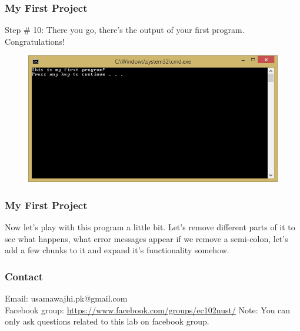 \documentclass{beamer}
\begin{document}
\begin{frame}
    \frametitle{My First Project}
    Step \# 10: There you go, there's the output of your first program. Congratulations!
    \begin{figure}
        \centering
        \includegraphics[scale=0.6]{step_15}
    \end{figure}
\end{frame}

\begin{frame}
    \frametitle{My First Project}
    Now let's play with this program a little bit. Let's remove different parts of it to see what happens, what error messages appear if we remove a semi-colon, let's add a few chunks to it and expand it's functionality somehow.
\end{frame}

\begin{frame}
	\frametitle{Contact}
	Email: usamawajhi.pk@gmail.com\\
	Facebook group: \href{https://www.facebook.com/groups/ec102nust/}{https://www.facebook.com/groups/ec102nust/}
	\newline
	\newline
	{\color{red} Note:} You can only ask questions related to this lab on facebook group.
\end{frame}
\end{document}
